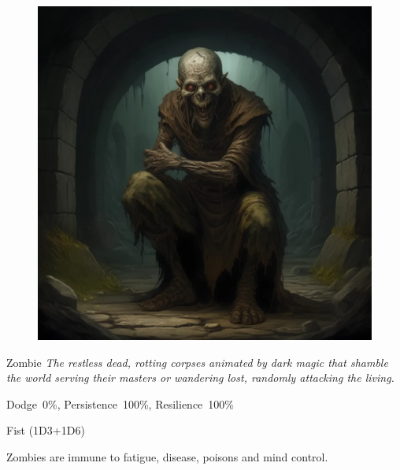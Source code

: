 	

\begin{samepage}
\begin{figure}[h]
\begin{center}
\includegraphics[scale=0.24]{img/ai-images/zombie.png}
\end{center}
\end{figure}
\begin{monsterbox}{Zombie}
	\textit{The restless dead, rotting corpses animated by dark magic that shamble the world serving their masters or wandering lost, randomly attacking the living.}\\
	\rpghline
	\basics[%
        hitpoints  = 7, 
	majorwound = 4,
	damagemodifier = +1D6,
	powerpoints = 0,
	movementrate = 7m,
	armor = None,
	plunderrating = 0
	]
	\rpghline%
	\stats[ %
		STR = 3D6+12 (23),
		CON = 1D6    (4),
		DEX = 1D6+3  (7),
		SIZ = 3D6    (10),
		INT = 1D3    (2),
		POW = 0      (0),
		CHA = 1D3    (2)
	]
	\rpghline
	\begin{rpg-monsteraction}[Resistances]
		Dodge~0\%, Persistence~100\%, Resilience~100\%
	\end{rpg-monsteraction}
	\begin{rpg-monsteraction}
		Fist (1D3+1D6)
	\end{rpg-monsteraction}
	\begin{rpg-monsteraction}[Immunities]
		Zombies are immune to fatigue, disease, poisons and mind control.
	\end{rpg-monsteraction}
\end{monsterbox}
\end{samepage}
	
\newpage


